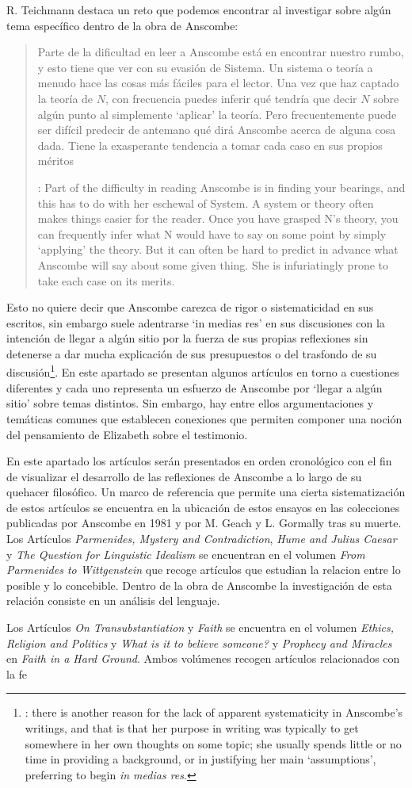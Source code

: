 R. Teichmann destaca un reto que podemos encontrar al investigar sobre algún tema específico dentro de la obra de Anscombe:
\blockquote[{\Cite[1]{teichmann2008ans}}: Part of the difficulty in reading Anscombe is in finding your bearings, and this has to do with her eschewal of System. A system or theory often makes things easier for the reader. Once you have grasped N's theory, you can frequently infer what N would have to say on some point by simply `applying' the theory. But it can often be hard to predict in advance what Anscombe will say about some given thing. She is infuriatingly prone to take each case on its merits.]
{Parte de la dificultad en leer a Anscombe está en encontrar nuestro rumbo, y esto tiene que ver con su evasión de Sistema. Un sistema o teoría a menudo hace las cosas más fáciles para el lector. Una vez que haz captado la teoría de $N$, con frecuencia puedes inferir qué tendría que decir $N$ sobre algún punto al simplemente \enquote*{aplicar} la teoría. Pero frecuentemente puede ser difícil predecir de antemano qué dirá Anscombe acerca de alguna cosa dada. Tiene la exasperante tendencia a tomar cada caso en sus propios méritos}. 
Esto no quiere decir que Anscombe carezca de rigor o sistematicidad en sus escritos, sin embargo suele adentrarse \enquote*{in medias res} en sus discusiones con la intención de llegar a algún sitio por la fuerza de sus propias reflexiones sin detenerse a dar mucha explicación de sus presupuestos o del trasfondo de su discusión\footnote{\Cite[Cf.][1]{teichmann2008ans}: \textelp{} there is another reason for the lack of apparent systematicity in Anscombe's writings, and that is that her purpose in writing was typically to get somewhere in her own thoughts on some topic; she usually spends little or no time in providing a background, or in justifying her main `assumptions', preferring to begin \emph{in medias res}.}.
En este apartado se presentan algunos artículos en torno a cuestiones diferentes y cada uno representa un esfuerzo de Anscombe por \enquote*{llegar a algún sitio} sobre temas distintos. Sin embargo, hay entre ellos argumentaciones y temáticas comunes que establecen conexiones que permiten componer una noción del pensamiento de Elizabeth sobre el testimonio. 

En este apartado los artículos serán presentados en orden cronológico con el fin de visualizar el desarrollo de las reflexiones de Anscombe a lo largo de su quehacer filosófico. Un marco de referencia que permite una cierta sistematización de estos artículos se encuentra en la ubicación de estos ensayos en las colecciones publicadas por Anscombe en 1981 y por M. Geach y L. Gormally tras su muerte. Los Artículos \emph{Parmenides, Mystery and Contradiction}, \emph{Hume and Julius Caesar} y \emph{The Question for Linguistic Idealism} se encuentran en el volumen \emph{From Parmenides to Wittgenstein} que recoge artículos que estudian la relacion entre lo posible y lo concebible. Dentro de la obra de Anscombe la investigación de esta relación consiste en un análisis del lenguaje. 

Los Artículos \emph{On Transubstantiation} y \emph{Faith} se encuentra en el volumen \emph{Ethics, Religion and Politics} y \emph{What is it to believe someone?} y \emph{Prophecy and Miracles} en \emph{Faith in a Hard Ground}. Ambos volúmenes recogen artículos relacionados con la fe
